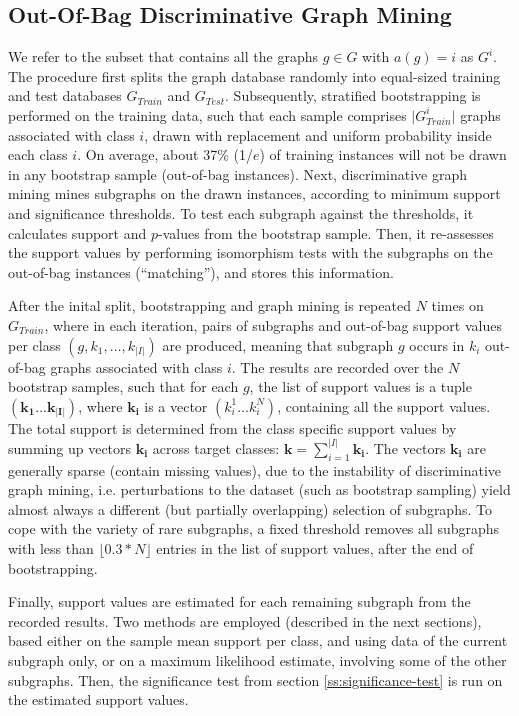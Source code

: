 \documentclass{sig-alternate}
\begin{document}
\subsection{Out-Of-Bag Discriminative Graph Mining}
\label{ss:oob-dgm}
We refer to the subset that contains all the graphs $g \in G$
with $a(g)=i$ as $G^i$.  The procedure first splits the graph database randomly
into equal-sized training and test databases $G_{Train}$ and $G_{Test}$.
Subsequently, stratified bootstrapping is performed on the training data, such
that each sample comprises $\vert G_{Train}^i\vert$ graphs associated with
class $i$, drawn with replacement and uniform probability inside each
class $i$.  On average, about 37\% (1/$e$) of training instances 
will not be drawn in any bootstrap sample (out-of-bag instances). 
Next, discriminative graph mining mines subgraphs on the drawn instances,
according to minimum support and significance thresholds. To test each subgraph against the thresholds, it
calculates support and $p$-values from the bootstrap sample.
Then, it re-assesses the support values by performing isomorphism
tests with the subgraphs on the out-of-bag instances (``matching''), and stores this information.

After the inital split, bootstrapping and graph mining is repeated $N$ times on $G_{Train}$, where in each
iteration, pairs of subgraphs and out-of-bag support values per class
$(g,k_1,\ldots,k_{\vert I\vert})$ are produced, meaning that subgraph $g$
occurs in $k_i$ out-of-bag graphs associated with class $i$. The results are
recorded over the $N$ bootstrap samples, such that for each $g$, the list of
support values is a tuple $(\mathbf{k_1}\ldots\mathbf{k_{\vert I\vert}})$,
where $\mathbf{k_i}$ is a vector $(k_i^1\ldots k_i^N)$, containing all the
support values.  
The total support is determined from the class specific support values by
summing up vectors $\mathbf{k_i}$ across target classes:
$\mathbf{k}=\sum_{i=1}^{\vert I\vert} \mathbf{k_i}$. The vectors $\mathbf{k_i}$
are generally sparse (contain missing values), due to the instability of discriminative graph mining,
i.e. perturbations to the dataset (such as bootstrap sampling) yield almost
always a different (but partially overlapping) selection of subgraphs. To cope with the
variety of rare subgraphs, a fixed threshold removes all subgraphs with less
than $\lfloor0.3*N\rfloor$ entries in the list of support values, after the end
of bootstrapping.

Finally, support values are estimated for each remaining
subgraph from the recorded results. Two methods are employed (described in the next sections), based either
on the sample mean support per class, and using data of the current subgraph
only, or on a maximum likelihood estimate, involving some of the other
subgraphs. Then, the significance test from section \ref{ss:significance-test}
is run on the estimated support values. 
\end{document}
